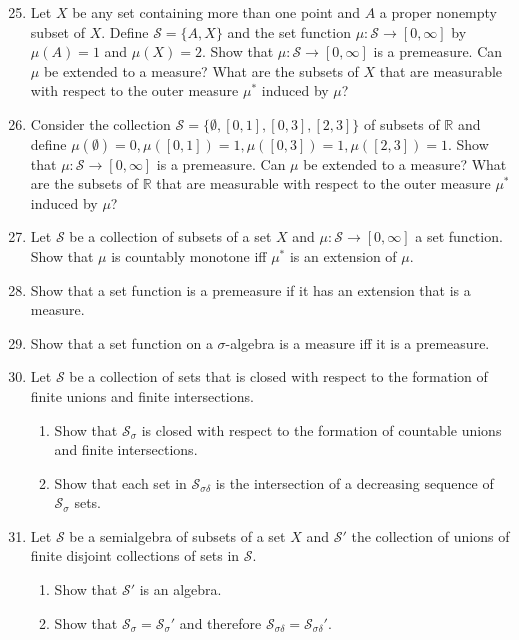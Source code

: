 \begin{enumerate}
	\setcounter{enumi}{24}
	\item Let $X$ be any set containing more than one point and $A$ a proper nonempty subset of $X$.
	Define $\mathcal{S}=\{A,X\}$ and the set function $\mu:\mathcal{S}\to[0,\infty]$ by $\mu(A)=1$ and $\mu(X)=2$.
	Show that $\mu:\mathcal{S}\to[0,\infty]$ is a premeasure.
	Can $\mu$ be extended to a measure?
	What are the subsets of $X$ that are measurable with respect to the outer measure $\mu^*$ induced by $\mu$?
	\item Consider the collection $\mathcal{S}=\{\emptyset,[0,1],[0,3],[2,3]\}$ of subsets of $\mathbb{R}$ and define $\mu(\emptyset)=0,\mu([0,1])=1,\mu([0,3])=1,\mu([2,3])=1$.
	Show that $\mu:\mathcal{S}\to[0,\infty]$ is a premeasure.
	Can $\mu$ be extended to a measure?
	What are the subsets of $\mathbb{R}$ that are measurable with respect to the outer measure $\mu^*$ induced by $\mu$?
	\item Let $\mathcal{S}$ be a collection of subsets of a set $X$ and $\mu:\mathcal{S}\to[0,\infty]$ a set function.
	Show that $\mu$ is countably monotone iff $\mu^*$ is an extension of $\mu$.
	\item Show that a set function is a premeasure if it has an extension that is a measure.
	\item Show that a set function on a $\sigma$-algebra is a measure iff it is a premeasure.
	\item Let $\mathcal{S}$ be a collection of sets that is closed with respect to the formation of finite unions and finite intersections.
	\begin{enumerate}[label=(\roman*),align=left]  
		\item Show that $\mathcal{S}_\sigma$ is closed with respect to the formation of countable unions and finite intersections.
		\item Show that each set in $\mathcal{S}_{\sigma\delta}$ is the intersection of a decreasing sequence of $\mathcal{S}_\sigma$ sets.
	\end{enumerate}
	\item Let $\mathcal{S}$ be a semialgebra of subsets of a set $X$ and $\mathcal{S}'$ the collection of unions of finite disjoint collections of sets in $\mathcal{S}$.
	\begin{enumerate}[label=(\roman*),align=left]  
		\item Show that $\mathcal{S}'$ is an algebra.
		\item Show that $\mathcal{S}_\sigma=\mathcal{S}_\sigma'$ and therefore $\mathcal{S}_{\sigma\delta}=\mathcal{S}_{\sigma\delta}'$.

\end{enumerate}
\end{enumerate}
